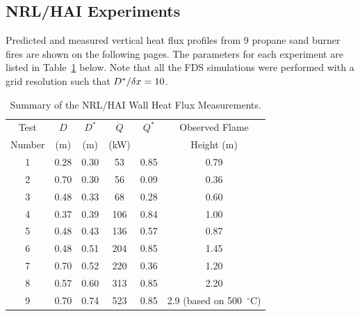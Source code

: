\clearpage



\subsection{NRL/HAI Experiments}

Predicted and measured vertical heat flux profiles from 9 propane sand burner fires are shown on the following pages. The parameters for each
experiment are listed in Table~\ref{NRL/HAI_Parameters} below. Note that all the FDS simulations were performed with a grid resolution such that
$D^*/\delta x=10$.

\begin{table}[ht]
\caption[Summary of the NRL/HAI Wall Heat Flux Measurements]{Summary of the NRL/HAI Wall Heat Flux Measurements.}
\begin{center}
\begin{tabular}{|c|c|c|c|c|c|}
\hline
Test     & $D$     & $D^*$      & $\dot{Q}$   & $Q^*$   & Observed  Flame \\
Number   & (m)     & (m)        & (kW)        &         & Height (m)      \\ \hline \hline
1        & 0.28    & 0.30       &  53         & 0.85    & 0.79            \\ \hline
2        & 0.70    & 0.30       &  56         & 0.09    & 0.36            \\ \hline
3        & 0.48    & 0.33       &  68         & 0.28    & 0.60            \\ \hline
4        & 0.37    & 0.39       &  106        & 0.84    & 1.00            \\ \hline
5        & 0.48    & 0.43       &  136        & 0.57    & 0.87            \\ \hline
6        & 0.48    & 0.51       &  204        & 0.85    & 1.45            \\ \hline
7        & 0.70    & 0.52       &  220        & 0.36    & 1.20            \\ \hline
8        & 0.57    & 0.60       &  313        & 0.85    & 2.20            \\ \hline
9        & 0.70    & 0.74       &  523        & 0.85    & 2.9 (based on 500~$^\circ$C)       \\ \hline
\end{tabular}
\end{center}
\label{NRL/HAI_Parameters}
\end{table}

\newpage

